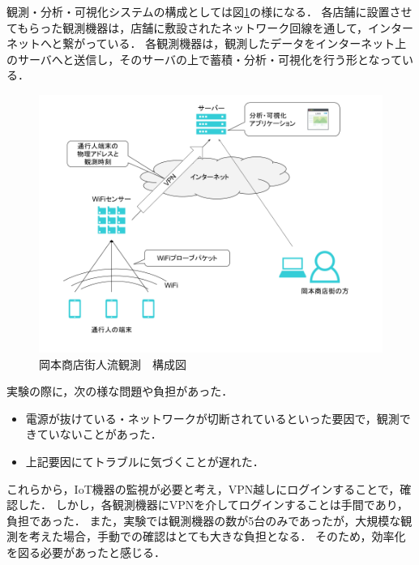 観測・分析・可視化システムの構成としては図\ref{fig:okamoto_diag1}の様になる．
各店舗に設置させてもらった観測機器は，店舗に敷設されたネットワーク回線を通して，インターネットへと繋がっている．
各観測機器は，観測したデータをインターネット上のサーバへと送信し，そのサーバの上で蓄積・分析・可視化を行う形となっている．
\begin{figure}[htb]
\includegraphics[width=16cm]{images/okamoto_diag1.png}
\caption{岡本商店街人流観測　構成図}
\label{fig:okamoto_diag1}
\end{figure}
\medskip

実験の際に，次の様な問題や負担があった．
\begin{itemize}
\item 電源が抜けている・ネットワークが切断されているといった要因で，観測できていないことがあった．
\item 上記要因にてトラブルに気づくことが遅れた．
\end{itemize}
これらから，IoT機器の監視が必要と考え，VPN越しにログインすることで，確認した．
しかし，各観測機器にVPNを介してログインすることは手間であり，負担であった．
また，実験では観測機器の数が5台のみであったが，大規模な観測を考えた場合，手動での確認はとても大きな負担となる．
そのため，効率化を図る必要があったと感じる．

